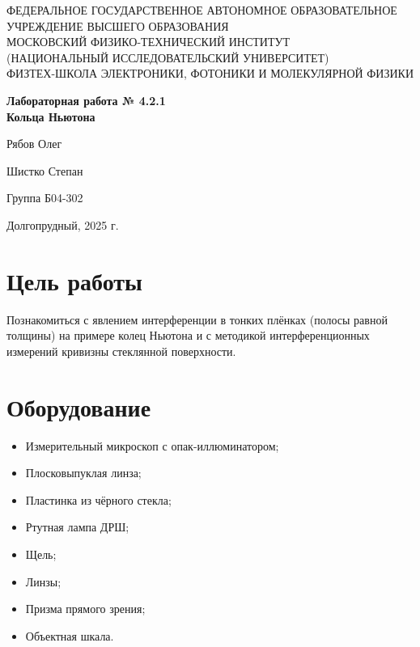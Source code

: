 \documentclass[a4paper, 12pt]{article}
\begin{document}
\begin{center}
  \footnotesize{ФЕДЕРАЛЬНОЕ ГОСУДАРСТВЕННОЕ АВТОНОМНОЕ ОБРАЗОВАТЕЛЬНОЕ УЧРЕЖДЕНИЕ ВЫСШЕГО ОБРАЗОВАНИЯ}\\
  \footnotesize{МОСКОВСКИЙ ФИЗИКО-ТЕХНИЧЕСКИЙ ИНСТИТУТ\\(НАЦИОНАЛЬНЫЙ ИССЛЕДОВАТЕЛЬСКИЙ УНИВЕРСИТЕТ)}\\
  \footnotesize{ФИЗТЕХ-ШКОЛА ЭЛЕКТРОНИКИ, ФОТОНИКИ И МОЛЕКУЛЯРНОЙ ФИЗИКИ}\\
  \vspace{2cm} %
\end{center}

\thispagestyle{empty} %

\begin{center}
    \vspace*{\fill} %
    {\Huge \textbf{Лабораторная работа № 4.2.1}} \\[0.5cm]
    {\LARGE \textbf{Кольца Ньютона}} %
    \vspace*{\fill} %
\end{center}

\vspace{1cm} %
\begin{flushright}
  Рябов Олег \par
  Шистко Степан \par
  Группа Б04-302 
\end{flushright}

\vfill
\begin{center}
  Долгопрудный, 2025 г.
\end{center}
\newpage


\section*{Цель работы}
\quad Познакомиться с явлением интерференции в тонких плёнках (полосы равной толщины) на примере колец Ньютона и с методикой интерференционных измерений кривизны стеклянной поверхности.

\section*{Оборудование}
\begin{itemize}
    \item Измерительный микроскоп с опак-иллюминатором;
    \item Плосковыпуклая линза;
    \item Пластинка из чёрного стекла;
    \item Ртутная лампа ДРШ;
    \item Щель;
    \item Линзы;
    \item Призма прямого зрения;
    \item Объектная шкала.
\end{itemize}
\end{document}
